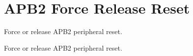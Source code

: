 \hypertarget{group___r_c_c_ex___a_p_b2___force___release___reset}{}\section{A\+P\+B2 Force Release Reset}
\label{group___r_c_c_ex___a_p_b2___force___release___reset}


Force or release A\+P\+B2 peripheral reset.  


Force or release A\+P\+B2 peripheral reset. 

